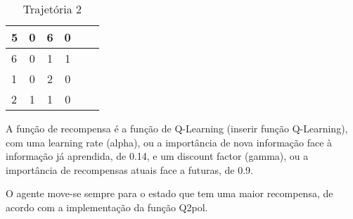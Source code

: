\documentclass{scrartcl}
\begin{document}
	\begin{table}[h!]
	  \centering
	  \caption{Trajetória 2}
	  \label{tab:Trajetória 2}
	  \begin{tabular}{|l|c|c|c|c|r|}
	  	\hline
	    5 & 0 & 6 & 0\\
	    \hline
	    6 & 0 & 1 & 1\\
	    \hline
	    1 & 0 & 2 & 0\\
	    \hline
	    2 & 1 & 1 & 0\\
	    \hline
	  \end{tabular}
	\end{table}
	\par

A função de recompensa é a função de Q-Learning (inserir função Q-Learning), com uma learning rate (alpha), ou a importância de nova informação face
à informação já aprendida, de 0.14, e um discount factor (gamma), ou a importância de recompensas atuais face a futuras, de 0.9.\par

O agente move-se sempre para o estado que tem uma maior recompensa, de acordo com a implementação da função Q2pol.\par
\end{document}
